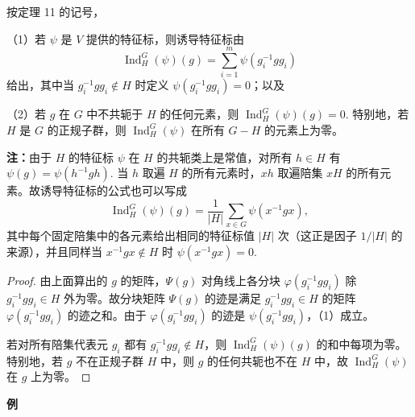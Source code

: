 \begin{corollary}\label{cor:19.12}
按定理 11 的记号，

（1）若 \(\psi\) 是 \(V\) 提供的特征标，则诱导特征标由
\[
\operatorname{Ind}_H^G(\psi)(g) = \sum_{i=1}^{m}\psi(g_i^{-1}gg_i)
\]
给出，其中当 \(g_i^{-1}gg_i \notin H\) 时定义 \(\psi(g_i^{-1}gg_i) = 0\)；以及

（2）若 \(g\) 在 \(G\) 中不共轭于 \(H\) 的任何元素，则 \(\operatorname{Ind}_H^G(\psi)(g) = 0\). 特别地，若 \(H\) 是 \(G\) 的正规子群，则 \(\operatorname{Ind}_H^G(\psi)\) 在所有 \(G - H\) 的元素上为零。
\end{corollary}

\noindent\textbf{注：}由于 \(H\) 的特征标 \(\psi\) 在 \(H\) 的共轭类上是常值，对所有 \(h \in H\) 有 \(\psi(g) = \psi(h^{-1}gh)\). 当 \(h\) 取遍 \(H\) 的所有元素时，\(xh\) 取遍陪集 \(xH\) 的所有元素。故诱导特征标的公式也可以写成
\[
\operatorname{Ind}_H^G(\psi)(g) = \frac{1}{|H|}\sum_{x \in G}\psi(x^{-1}gx),
\]
其中每个固定陪集中的各元素给出相同的特征标值 \(|H|\) 次（这正是因子 \(1/|H|\) 的来源），并且同样当 \(x^{-1}gx \notin H\) 时 \(\psi(x^{-1}gx) = 0\).

\begin{proof}
由上面算出的 \(g\) 的矩阵，\(\Psi(g)\) 对角线上各分块 \(\varphi(g_i^{-1}gg_i)\) 除 \(g_i^{-1}gg_i \in H\) 外为零。故分块矩阵 \(\Psi(g)\) 的迹是满足 \(g_i^{-1}gg_i \in H\) 的矩阵 \(\varphi(g_i^{-1}gg_i)\) 的迹之和。由于 \(\varphi(g_i^{-1}gg_i)\) 的迹是 \(\psi(g_i^{-1}gg_i)\)，（1）成立。

若对所有陪集代表元 \(g_i\) 都有 \(g_i^{-1}gg_i \notin H\)，则 \(\operatorname{Ind}_H^G(\psi)(g)\) 的和中每项为零。特别地，若 \(g\) 不在正规子群 \(H\) 中，则 \(g\) 的任何共轭也不在 \(H\) 中，故 \(\operatorname{Ind}_H^G(\psi)\) 在 \(g\) 上为零。
\end{proof}

\noindent\textbf{例}

